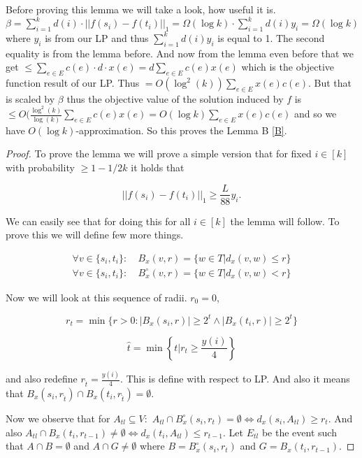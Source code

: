 Before proving this lemma we will take a look, how useful it is. $\beta = \sum_{i = 1}^{k} d(i) \cdot ||f(s_{i}) - f(t_{i})||_{1} = \Omega(\log k) \cdot \sum_{i = 1}^{k} d(i) y_{i} = \Omega(\log k)$ where $y_{i}$ is from our LP and thus $\sum_{i = 1}^{k} d(i) y_{i}$ is equal to 1. The second equality is from the lemma before. And now from the lemma even before that we get $\leq \sum_{e \in E} c(e) \cdot d \cdot x(e) = d \sum_{e \in E} c(e) x(e)$ which is the objective function result of our LP. Thus $= O(\log^{2}(k)) \sum_{e \in E} x(e) c(e)$. But that is scaled by $\beta$ thus the objective value of the solution induced by $f$ is $\leq O(\frac{\log^{2}(k)}{\log(k)} \sum_{e \in E} c(e) x(e) = O(\log k) \sum_{e \in E} x(e) c(e)$ and so we have $O(\log k)$-approximation. So this proves the Lemma B \ref{B}.

\begin{proof}
	To prove the lemma we will prove a simple version that for fixed $i \in [k]$ with probability $\geq 1 - 1/2k$ it holds that
	
	$$
	||f(s_{i}) - f(t_{i})||_{1} \geq \frac{L}{88} y_{i}.
	$$
	
	We can easily see that for doing this for all $i \in [k]$ the lemma will follow. To prove this we will define few more things.
	
	$$
	\begin{aligned}
		\forall v \in \{s_{i}, t_{i}\}: &\ B_{x}(v, r) = \{w \in T | d_{x}(v,w) \leq r\}\\
		\forall v \in \{s_{i}, t_{i}\}: &\ B_{x}^{\circ}(v, r) = \{w \in T | d_{x}(v,w) < r\}
	\end{aligned}
	$$
	
	Now we will look at this sequence of radii. $r_{0} = 0$,
	
	$$
	r_{t} = \min \{r > 0 : |B_{x}(s_{i},r)| \geq 2^{t} \land |B_{x}(t_{i},r)| \geq 2^{t}\}
	$$
	
	$$
	\hat{t} = \min \left\{t | r_{t} \geq \frac{y(i)}{4}\right\}
	$$
	
	and also redefine $r_{\hat{t}} = \frac{y(i)}{4}$. This is define with respect to LP. And also it means that $B_{x}(s_{i}, r_{\hat{t}}) \cap B_{x}(t_{i}, r_{\hat{t}}) = \emptyset$.
	
	Now we observe that for $A_{tl} \subseteq V:$ $A_{tl} \cap B_{x}^{\circ}(s_{i}, r_{t}) = \emptyset \Leftrightarrow d_{x}(s_{i}, A_{tl}) \geq r_{t}$. And also $A_{tl} \cap B_{x}(t_{i}, r_{t - 1}) \neq \emptyset \Leftrightarrow d_{x}(t_{i}, A_{tl}) \leq r_{t - 1}$. Let $E_{tl}$ be the event such that $A \cap B = \emptyset$ and $A \cap G \neq \emptyset$ where $B = B_{x}^{\circ}(s_{i}, r_{t})$ and $G = B_{x}(t_{i}, r_{t - 1})$.
	

\end{proof}
